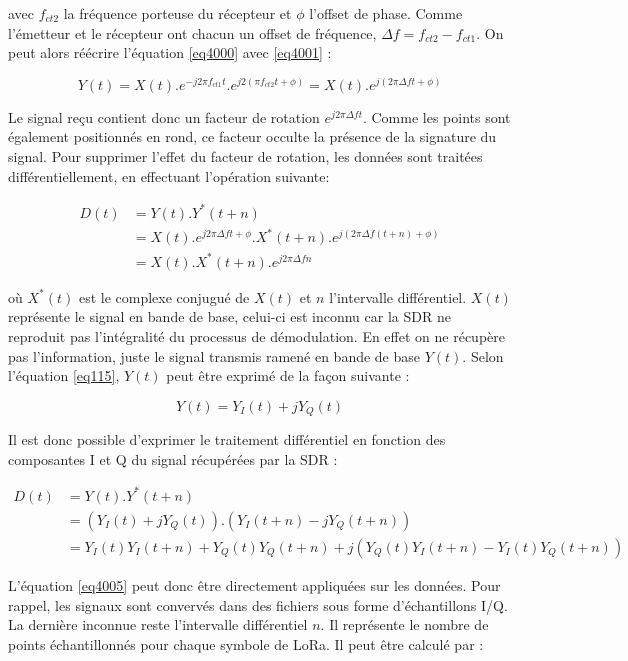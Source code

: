 avec $f_{ct2}$ la fréquence porteuse du récepteur et $\phi$ l'offset de phase. Comme l'émetteur et le récepteur ont chacun un offset de fréquence, $\Delta f = f_{ct2} - f_{ct1}$. On peut alors réécrire l'équation \ref{eq4000} avec \ref{eq4001} :

\begin{equation}\label{eq4002}
	Y(t) = X(t) . e^{-j2\pi f_{ct1} t} . e^{j2(\pi f_{ct2} t+ \phi)} = X(t) . e^{j(2\pi \Delta f t + \phi)}
\end{equation} 

Le signal reçu contient donc un facteur de rotation $e^{j2\pi \Delta f t}$. Comme les points sont également positionnés en rond, ce facteur occulte la présence de la signature du signal.
Pour supprimer l'effet du facteur de rotation, les données sont traitées différentiellement, en effectuant l'opération suivante:

\begin{align}\label{eq4003}
	D(t) &= Y(t) . Y^{*}(t+n) \\
		 &= X(t) . e^{j2\pi \Delta f t+ \phi} .X^{*}(t+n) . e^{j(2\pi \Delta f (t + n) + \phi)} \nonumber \\
 		 &= X(t) . X^{*}(t+n) . e^{j2\pi \Delta f n}
\end{align}

où $X^{*}(t)$ est le complexe conjugué de $X(t)$ et $n$ l'intervalle différentiel. $X(t)$ représente le signal en bande de base, celui-ci est inconnu car la SDR ne reproduit pas l'intégralité du processus de démodulation. En effet on ne récupère pas l'information, juste le signal transmis ramené en bande de base $Y(t)$. Selon l'équation \ref{eq115}, $Y(t)$ peut être exprimé de la façon suivante : 

\begin{equation}\label{eq4004}
	Y(t) = Y_I(t) + jY_Q(t)
\end{equation} 

Il est donc possible d'exprimer le traitement différentiel en fonction des composantes I et Q du signal récupérées par la SDR :

\begin{align}\label{eq4005}
	D(t) &= Y(t) . Y^{*}(t+n) \nonumber \\
		 &= (Y_I(t) + jY_Q(t)) . (Y_I(t+n) - jY_Q(t+n)) \nonumber \\
 		 &= Y_I(t)Y_I(t+n) + Y_Q(t)Y_Q(t+n) + j(Y_Q(t)Y_I(t+n) - Y_I(t)Y_Q(t+n))
\end{align}

L'équation \ref{eq4005} peut donc être directement appliquées sur les données. Pour rappel, les signaux sont convervés dans des fichiers sous forme d'échantillons \ac{I/Q}. La dernière inconnue reste l'intervalle différentiel $n$. Il représente le nombre de points échantillonnés pour chaque symbole de LoRa. Il peut être calculé par :

